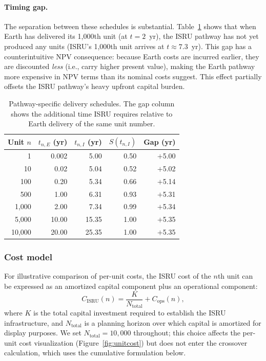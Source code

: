 \documentclass[preprint,12pt]{elsarticle}
\begin{document}
\paragraph{Timing gap.} The separation between these schedules is substantial. Table~\ref{tab:production_schedule} shows that when Earth has delivered its 1{,}000th unit (at $t = 2$~yr), the ISRU pathway has not yet produced any units (ISRU's 1{,}000th unit arrives at $t \approx 7.3$~yr). This gap has a counterintuitive NPV consequence: because Earth costs are incurred earlier, they are discounted \emph{less} (i.e., carry higher present value), making the Earth pathway more expensive in NPV terms than its nominal costs suggest. This effect partially offsets the ISRU pathway's heavy upfront capital burden.

\begin{table}[htbp]
\centering
\caption{Pathway-specific delivery schedules. The gap column shows the additional time ISRU requires relative to Earth delivery of the same unit number.}
\label{tab:production_schedule}
\small
\begin{tabular}{@{}rrrrr@{}}
\toprule
Unit $n$ & $t_{n,E}$ (yr) & $t_{n,I}$ (yr) & $S(t_{n,I})$ & Gap (yr) \\
\midrule
1      & 0.002 & 5.00  & 0.50 & $+$5.00 \\
10     & 0.02  & 5.04  & 0.52 & $+$5.02 \\
100    & 0.20  & 5.34  & 0.66 & $+$5.14 \\
500    & 1.00  & 6.31  & 0.93 & $+$5.31 \\
1{,}000  & 2.00  & 7.34  & 0.99 & $+$5.34 \\
5{,}000  & 10.00 & 15.35 & 1.00 & $+$5.35 \\
10{,}000 & 20.00 & 25.35 & 1.00 & $+$5.35 \\
\bottomrule
\end{tabular}
\end{table}

\subsubsection{Cost model}

For illustrative comparison of per-unit costs, the ISRU cost of the $n$th unit can be expressed as an amortized capital component plus an operational component:
\begin{equation}
  C_{\mathrm{ISRU}}(n) = \frac{K}{N_{\mathrm{total}}} + C_{\mathrm{ops}}(n),
  \label{eq:isru_unit}
\end{equation}
where $K$ is the total capital investment required to establish the ISRU infrastructure, and $N_{\mathrm{total}}$ is a planning horizon over which capital is amortized for display purposes. We set $N_{\mathrm{total}} = 10{,}000$ throughout; this choice affects the per-unit cost visualization (Figure~\ref{fig:unitcost}) but does not enter the crossover calculation, which uses the cumulative formulation below.
\end{document}
